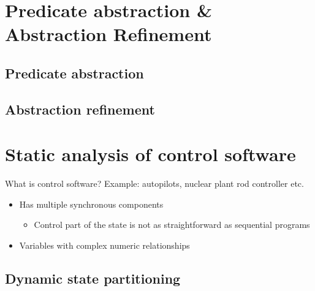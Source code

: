 \documentclass[aspectratio=169,14pt]{beamer}
\begin{document}
\section{Predicate abstraction \& Abstraction Refinement}
\subsection{Predicate abstraction}
\subsection{Abstraction refinement}

\section{Static analysis of control software}
\begin{frame}{What is control software?}
  Example: autopilots, nuclear plant rod controller etc.
  
  \begin{itemize}
  \item<2-> Has multiple synchronous components
    \begin{itemize}
    \item<3-> Control part of the state is not as straightforward as sequential programs
    \end{itemize}
  \item<4-> Variables with complex numeric relationships
  \end{itemize}
\end{frame}
\subsection{Dynamic state partitioning}
\begin{frame}{}
  
\end{frame}

\begin{frame}{}
  
\end{frame}
\end{document}
